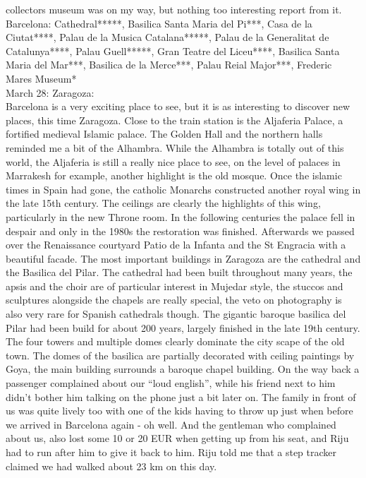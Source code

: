 collectors museum was on my way, but nothing too interesting report from it. \\

Barcelona: Cathedral*****, Basilica Santa Maria del Pi***, Casa de la Ciutat****, Palau de la Musica Catalana*****, Palau de la Generalitat de Catalunya****, Palau Guell*****, Gran Teatre del Liceu****, Basilica Santa Maria del Mar***, Basilica de la Merce***, Palau Reial Major***,  Frederic Mares Museum*\\

March 28: Zaragoza:\\
Barcelona is a very exciting place to see, but it is as interesting to discover new places, this time Zaragoza. Close to the train station is the Aljaferia Palace, a fortified medieval Islamic palace. The Golden Hall and the northern halls reminded me a bit of the Alhambra. While the Alhambra is totally out of this world, the Aljaferia is still a really nice place to see, on the level of palaces in Marrakesh for example, another highlight is the old mosque. Once the islamic times in Spain had gone, the catholic Monarchs constructed another royal wing in the late 15th century. The ceilings are clearly the highlights of this wing, particularly in the new Throne room. In the following centuries the palace fell in despair and only in the 1980s the restoration was finished.
Afterwards we passed over the Renaissance courtyard Patio de la Infanta and the St Engracia with a beautiful facade. The most important buildings in Zaragoza are the cathedral and the Basilica del Pilar. The cathedral had been built throughout many years, the apsis and the choir are of particular interest in Mujedar style, the stuccos and sculptures alongside the chapels are really special, the veto on photography is also very rare for Spanish cathedrals though. The gigantic baroque basilica del Pilar had been build for about 200 years, largely finished in the late 19th century. The four towers and multiple domes clearly dominate the city scape of the old town. The domes of the basilica are partially decorated with ceiling paintings by Goya, the main building surrounds a baroque chapel building. 
On the way back a passenger complained about our ``loud english'', while his friend next to him didn't bother him talking on the phone just a bit later on. The family in front of us was quite lively too with one of the kids having to throw up just when before we arrived in Barcelona again - oh well. And the gentleman who complained about us, also lost some 10 or 20 EUR when getting up from his seat, and Riju had to run after him to give it back to him. Riju told me that a step tracker claimed we had walked about 23 km on this day.\\

